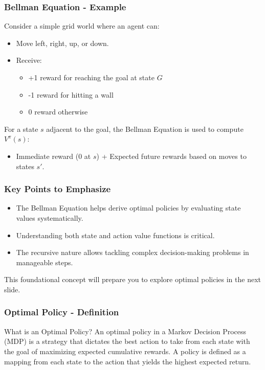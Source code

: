 \documentclass[aspectratio=169]{beamer}
\begin{document}
\begin{frame}[fragile]
  \frametitle{Bellman Equation - Example}
  Consider a simple grid world where an agent can:
  \begin{itemize}
    \item Move left, right, up, or down.
    \item Receive:
      \begin{itemize}
        \item +1 reward for reaching the goal at state $G$
        \item -1 reward for hitting a wall
        \item 0 reward otherwise
      \end{itemize}
  \end{itemize}

  For a state $s$ adjacent to the goal, the Bellman Equation is used to compute $V^\pi(s)$:
  \begin{itemize}
    \item Immediate reward (0 at $s$) + Expected future rewards based on moves to states $s'$.
  \end{itemize}
\end{frame}

\begin{frame}[fragile]
  \frametitle{Key Points to Emphasize}
  \begin{itemize}
    \item The Bellman Equation helps derive optimal policies by evaluating state values systematically.
    \item Understanding both state and action value functions is critical.
    \item The recursive nature allows tackling complex decision-making problems in manageable steps.
  \end{itemize}

  This foundational concept will prepare you to explore optimal policies in the next slide.
\end{frame}

\begin{frame}[fragile]
    \frametitle{Optimal Policy - Definition}
    \begin{block}{What is an Optimal Policy?}
        An optimal policy in a Markov Decision Process (MDP) is a strategy that dictates the best action to take from each state with the goal of maximizing expected cumulative rewards. 
        A policy is defined as a mapping from each state to the action that yields the highest expected return.
    \end{block}
\end{frame}
\end{document}

